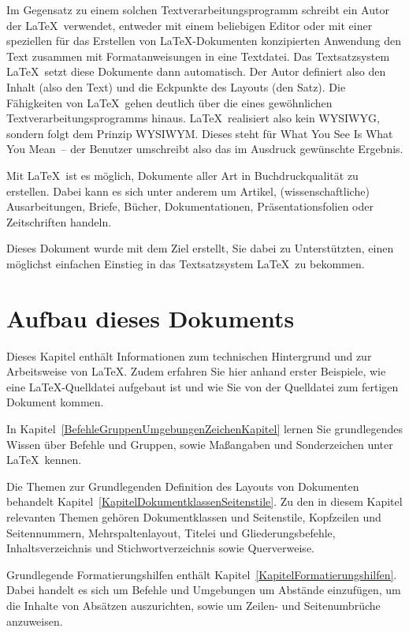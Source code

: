 \documentclass[a4paper,10pt,twoside]{scrbook}
\begin{document}
Im Gegensatz zu einem solchen Textverarbeitungsprogramm schreibt ein Autor der \LaTeX\ verwendet, entweder mit einem beliebigen Editor oder mit einer speziellen für das Erstellen von \LaTeX-Dokumenten konzipierten Anwendung
den Text zusammen mit Formatanweisungen in eine Textdatei. 
Das Textsatzsystem \LaTeX\ setzt diese Dokumente dann automatisch. Der Autor definiert also den Inhalt (also den
Text) und die Eckpunkte des Layouts (den Satz). Die Fähigkeiten 
von \LaTeX\ gehen deutlich über die eines 
gewöhnlichen Textverarbeitungsprogramms hinaus. \LaTeX\ realisiert also kein WYSIWYG, sondern folgt dem Prinzip WYSIWYM. Dieses steht für \glqq What You See Is What You Mean\grqq\ -- der Benutzer umschreibt also das im Ausdruck gewünschte Ergebnis.




Mit \LaTeX\ ist es möglich, Dokumente aller Art in Buchdruckqualität zu erstellen.
Dabei kann es sich unter anderem um Artikel, (wissenschaftliche)
Ausarbeitungen, Briefe, Bücher, Dokumentationen, Präsentationsfolien oder
Zeitschriften handeln. 


Dieses Dokument wurde mit dem Ziel erstellt, Sie dabei zu Unterstützten, einen möglichst einfachen Einstieg in das Textsatzsystem \LaTeX\ zu bekommen.




\section{Aufbau dieses Dokuments}

Dieses Kapitel enthält Informationen zum technischen Hintergrund und zur Arbeitsweise von \LaTeX. Zudem erfahren Sie hier anhand erster Beispiele, wie eine \LaTeX-Quelldatei aufgebaut ist und wie Sie von der Quelldatei zum fertigen Dokument kommen. 

In Kapitel~\ref{BefehleGruppenUmgebungenZeichenKapitel} lernen Sie grundlegendes Wissen über Befehle und Gruppen, sowie Maßangaben und Sonderzeichen unter \LaTeX\ kennen. 


Die Themen zur Grundlegenden Definition des Layouts von Dokumenten behandelt Kapitel~\ref{KapitelDokumentklassenSeitenstile}. Zu den in diesem Kapitel relevanten Themen gehören Dokumentklassen und Seitenstile, Kopfzeilen und Seitennummern, Mehrspaltenlayout, Titelei und Gliederungsbefehle, Inhaltsverzeichnis und Stichwortverzeichnis sowie Querverweise.


Grundlegende Formatierungshilfen enthält Kapitel~\ref{KapitelFormatierungshilfen}. Dabei handelt es sich um Befehle und Umgebungen um Abstände einzufügen, um die Inhalte von Absätzen auszurichten, sowie um Zeilen- und Seitenumbrüche anzuweisen.
\end{document}
